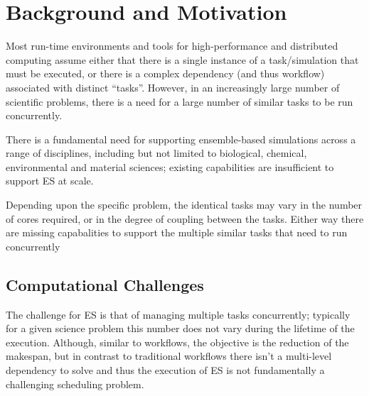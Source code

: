 \documentclass{sig-alternate}
\begin{document}
 

\section{Background and Motivation} 


Most run-time environments and tools for high-performance and
distributed computing assume either that there is a single instance of
a task/simulation that must be executed, or there is a complex
dependency (and thus workflow) associated with distinct ``tasks''.
However, in an increasingly large number of scientific problems, there
is a need for a large number of similar tasks to be run concurrently.

There is a fundamental need for supporting ensemble-based simulations
across a range of disciplines, including but not limited to
biological, chemical, environmental and material sciences; existing
capabilities are insufficient to support ES at scale.

Depending upon the specific problem, the identical tasks may vary in
the number of cores required, or in the degree of coupling between the
tasks.  Either way there are missing capabalities to support the
multiple similar tasks that need to run concurrently



\subsection{Computational Challenges}

The challenge for ES is that of managing multiple tasks concurrently;
typically for a given science problem this number does not vary during
the lifetime of the execution. Although, similar to workflows, the
objective is the reduction of the makespan, but in contrast to
traditional workflows there isn't a multi-level dependency to solve
and thus the execution of ES is not fundamentally a challenging
scheduling problem.
\end{document}
